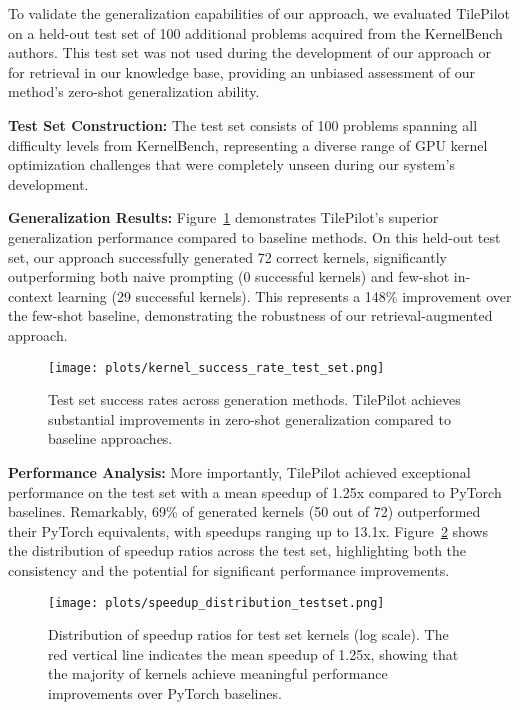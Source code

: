 \documentclass{article}
\begin{document}
To validate the generalization capabilities of our approach, we evaluated TilePilot on a held-out test set of 100 additional problems acquired from the KernelBench authors. This test set was not used during the development of our approach or for retrieval in our knowledge base, providing an unbiased assessment of our method's zero-shot generalization ability.

\textbf{Test Set Construction:} The test set consists of 100 problems spanning all difficulty levels from KernelBench, representing a diverse range of GPU kernel optimization challenges that were completely unseen during our system's development.

\textbf{Generalization Results:} Figure~\ref{fig:test_set_success} demonstrates TilePilot's superior generalization performance compared to baseline methods. On this held-out test set, our approach successfully generated 72 correct kernels, significantly outperforming both naive prompting (0 successful kernels) and few-shot in-context learning (29 successful kernels). This represents a 148\% improvement over the few-shot baseline, demonstrating the robustness of our retrieval-augmented approach.

\begin{figure}[htbp]
    \centering
    \texttt{[image: plots/kernel\_success\_rate\_test\_set.png]}
    \caption{Test set success rates across generation methods. TilePilot achieves substantial improvements in zero-shot generalization compared to baseline approaches.}
    \label{fig:test_set_success}
\end{figure}

\textbf{Performance Analysis:} More importantly, TilePilot achieved exceptional performance on the test set with a mean speedup of 1.25x compared to PyTorch baselines. Remarkably, 69\% of generated kernels (50 out of 72) outperformed their PyTorch equivalents, with speedups ranging up to 13.1x. Figure~\ref{fig:test_set_speedup} shows the distribution of speedup ratios across the test set, highlighting both the consistency and the potential for significant performance improvements.

\begin{figure}[htbp]
    \centering
    \texttt{[image: plots/speedup\_distribution\_testset.png]}
    \caption{Distribution of speedup ratios for test set kernels (log scale). The red vertical line indicates the mean speedup of 1.25x, showing that the majority of kernels achieve meaningful performance improvements over PyTorch baselines.}
    \label{fig:test_set_speedup}
\end{figure}
\end{document}
